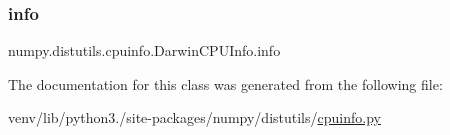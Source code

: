 \subsubsection{\texorpdfstring{info}{info}}
{\footnotesize\ttfamily numpy.\+distutils.\+cpuinfo.\+Darwin\+C\+P\+U\+Info.\+info\hspace{0.3cm}{\ttfamily [static]}}



The documentation for this class was generated from the following file\+:\begin{DoxyCompactItemize}
\item 
venv/lib/python3./site-\/packages/numpy/distutils/\hyperlink{cpuinfo_8py}{cpuinfo.\+py}\end{DoxyCompactItemize}

